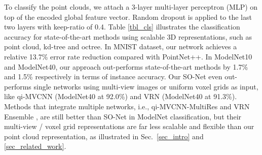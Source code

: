 \documentclass[10pt,twocolumn,letterpaper]{article}
\begin{document}
To classify the point clouds, we attach a 3-layer multi-layer perceptron (MLP) on top of the encoded global feature vector. Random dropout is applied to the last two layers with keep-ratio of 0.4. Table \ref{tbl_cls} illustrates the classification accuracy for state-of-the-art methods using scalable 3D representations, such as point cloud, kd-tree and octree. In MNIST dataset, our network achieves a relative 13.7\% error rate reduction compared with PointNet++. In ModelNet10 and ModelNet40, our approach out-performs state-of-the-art methods by 1.7\% and 1.5\% respectively in terms of instance accuracy. Our SO-Net even out-performs single networks using multi-view images or uniform voxel grids as input, like qi-MVCNN \cite{qi2016volumetric} (ModelNet40 at 92.0\%) and VRN \cite{brock2016generative} (ModelNet40 at 91.3\%). Methods that integrate multiple networks, i.e., qi-MVCNN-MultiRes \cite{qi2016volumetric} and VRN Ensemble \cite{brock2016generative}, are still better than SO-Net in ModelNet classification, but their multi-view / voxel grid representations are far less scalable and flexible than our point cloud representation, as illustrated in Sec.~\ref{sec_intro} and \ref{sec_related_work}. 
\end{document}
